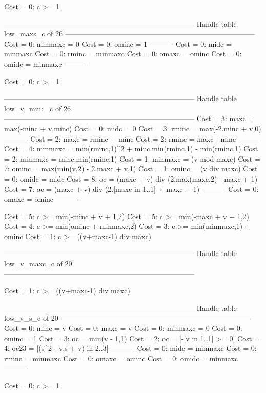 Cost =  0:  c >= 1

--------------------------------------------------------------------------------
Handle table low_maxs_c of 26
--------------------------------------------------------------------------------
Cost =  0:  minmaxc = 0
Cost =  0:  ominc   = 1
----------
Cost =  0:  midc    = minmaxc
Cost =  0:  rminc   = minmaxc
Cost =  0:  omaxc   = ominc
Cost =  0:  omidc   = minmaxc
----------

Cost =  0:  c >= 1

--------------------------------------------------------------------------------
Handle table low_v_minc_c of 26
--------------------------------------------------------------------------------
Cost =  3:  maxc    = max(-minc + v,minc)
Cost =  0:  midc    = 0
Cost =  3:  rminc   = max(-2.minc + v,0)
----------
Cost =  2:  maxc    = rminc + minc
Cost =  2:  rminc   = maxc - minc
----------
Cost =  4:  minmaxc = min(rminc,1)^2 + minc.min(rminc,1) - min(rminc,1)
Cost =  2:  minmaxc = minc.min(rminc,1)
Cost =  1:  minmaxc = (v mod maxc)
Cost =  7:  ominc   = max(min(v,2) - 2.maxc + v,1)
Cost =  1:  ominc   = (v div maxc)
Cost =  0:  omidc   = midc
Cost =  8:  oc      = (maxc + v) div (2.max(maxc,2) - maxc + 1)
Cost =  7:  oc      = (maxc + v) div (2.[maxc in 1..1] + maxc + 1)
----------
Cost =  0:  omaxc   = ominc
----------

Cost =  5:  c >= min(-minc + v + 1,2)
Cost =  5:  c >= min(-maxc + v + 1,2)
Cost =  4:  c >= min(ominc + minmaxc,2)
Cost =  3:  c >= min(minmaxc,1) + ominc
Cost =  1:  c >= ((v+maxc-1) div maxc)

--------------------------------------------------------------------------------
Handle table low_v_maxc_c of 20
--------------------------------------------------------------------------------

Cost =  1:  c >= ((v+maxc-1) div maxc)

--------------------------------------------------------------------------------
Handle table low_v_s_c of 20
--------------------------------------------------------------------------------
Cost =  0:  minc    = v
Cost =  0:  maxc    = v
Cost =  0:  minmaxc = 0
Cost =  0:  ominc   = 1
Cost =  3:  oc      = min(v - 1,1)
Cost =  2:  oc      = [-[v in 1..1] >= 0]
Cost =  4:  oc23    = [(s^2 - v.s + v) in 2..3]
----------
Cost =  0:  midc    = minmaxc
Cost =  0:  rminc   = minmaxc
Cost =  0:  omaxc   = ominc
Cost =  0:  omidc   = minmaxc
----------

Cost =  0:  c >= 1

